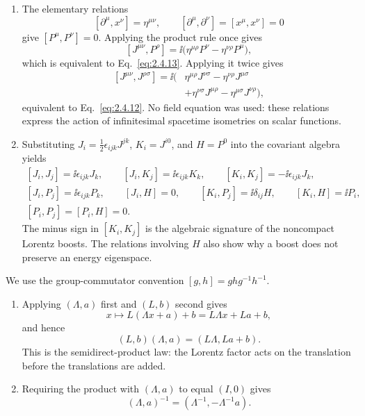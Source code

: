\begin{enumerate}
\begin{enumerate}
\item
The elementary relations
\[
 [\partial^\mu,x^\nu]=\eta^{\mu\nu},\qquad
 [\partial^\mu,\partial^\nu]=[x^\mu,x^\nu]=0
\]
give \([P^\mu,P^\nu]=0\).  Applying the product rule once gives
\[
 [J^{\mu\nu},P^\rho]
 =\ii\bigl(\eta^{\mu\rho}P^\nu-\eta^{\nu\rho}P^\mu\bigr),
\]
which is equivalent to Eq.~\eqref{eq:2.4.13}.  Applying it twice gives
\[
\begin{split}
 [J^{\mu\nu},J^{\rho\sigma}]
 =\ii(&\eta^{\mu\rho}J^{\nu\sigma}
 -\eta^{\nu\rho}J^{\mu\sigma}\\
 &+\eta^{\nu\sigma}J^{\mu\rho}
 -\eta^{\mu\sigma}J^{\nu\rho}),
\end{split}
\]
equivalent to Eq.~\eqref{eq:2.4.12}.  No field equation was used: these
relations express the action of infinitesimal spacetime isometries on
scalar functions.
\item
Substituting
\(J_i=\frac12\epsilon_{ijk}J^{jk}\), \(K_i=J^{i0}\), and \(H=P^0\)
into the covariant algebra yields
\[
\begin{gathered}
 [J_i,J_j]=\ii\epsilon_{ijk}J_k,\qquad
 [J_i,K_j]=\ii\epsilon_{ijk}K_k,\qquad
 [K_i,K_j]=-\ii\epsilon_{ijk}J_k,\\
 [J_i,P_j]=\ii\epsilon_{ijk}P_k,\qquad
 [J_i,H]=0,\qquad
 [K_i,P_j]=\ii\delta_{ij}H,\qquad
 [K_i,H]=\ii P_i,\\
 [P_i,P_j]=[P_i,H]=0.
\end{gathered}
\]
The minus sign in \([K_i,K_j]\) is the algebraic signature of the
noncompact Lorentz boosts.  The relations involving \(H\) also show why a
boost does not preserve an energy eigenspace.
\end{enumerate}

We use the group-commutator convention
\([g,h]=ghg^{-1}h^{-1}\).
\begin{enumerate}
\item[(i)] Applying \((\Lambda,a)\) first and \((L,b)\) second gives
\[
 x\longmapsto L(\Lambda x+a)+b=L\Lambda x+La+b,
\]
and hence
\[
 (L,b)(\Lambda,a)=(L\Lambda,La+b).
\]
This is the semidirect-product law: the Lorentz factor acts on the
translation before the translations are added.

\item[(ii)] Requiring the product with \((\Lambda,a)\) to equal
\((I,0)\) gives
\[
 (\Lambda,a)^{-1}=(\Lambda^{-1},-\Lambda^{-1}a).
\]


\end{enumerate}
\end{enumerate}
